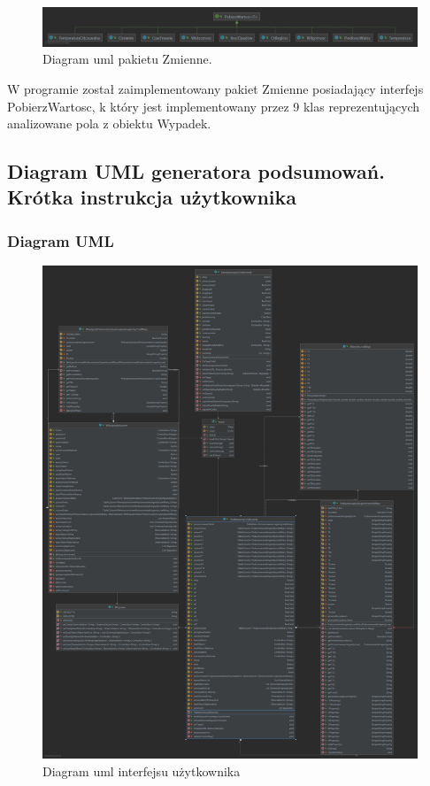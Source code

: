\documentclass{classrep}
\begin{document}
\begin{figure}[h!]
\centering
\includegraphics[width=14cm]{uml_2.png}
\vspace{-0.3cm}
\caption{Diagram uml pakietu Zmienne. }
\label{uml_zmienne}
\end{figure}


W programie został zaimplementowany pakiet Zmienne posiadający interfejs PobierzWartosc, k który jest implementowany przez 9 klas reprezentujących analizowane pola z obiektu Wypadek.

\newpage


\subsection{Diagram UML generatora podsumowań. Krótka instrukcja użytkownika}

\subsubsection{Diagram UML}

\begin{figure}[h!]
\centering
\includegraphics[width=15cm]{uml_3.png}
\vspace{-0.3cm}
\caption{Diagram uml interfejsu użytkownika }
\label{uml_gui}
\end{figure}
\end{document}
